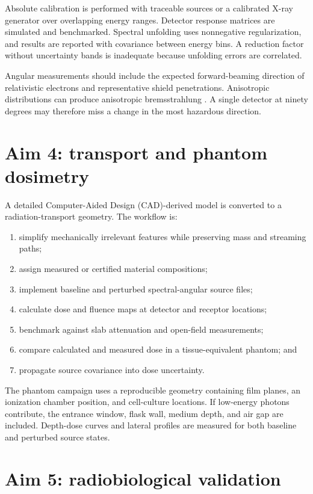 Absolute calibration is performed with traceable sources or a calibrated X-ray generator over overlapping energy ranges. Detector response matrices are simulated and benchmarked. Spectral unfolding uses nonnegative regularization, and results are reported with covariance between energy bins. A reduction factor without uncertainty bands is inadequate because unfolding errors are correlated.

Angular measurements should include the expected forward-beaming direction of relativistic electrons and representative shield penetrations. Anisotropic distributions can produce anisotropic bremsstrahlung \cite{massone2004}. A single detector at ninety degrees may therefore miss a change in the most hazardous direction.

\section{Aim 4: transport and phantom dosimetry}

A detailed Computer-Aided Design (CAD)-derived model is converted to a radiation-transport geometry. The workflow is:
\begin{enumerate}
\item simplify mechanically irrelevant features while preserving mass and streaming paths;
\item assign measured or certified material compositions;
\item implement baseline and perturbed spectral-angular source files;
\item calculate dose and fluence maps at detector and receptor locations;
\item benchmark against slab attenuation and open-field measurements;
\item compare calculated and measured dose in a tissue-equivalent phantom; and
\item propagate source covariance into dose uncertainty.
\end{enumerate}

The phantom campaign uses a reproducible geometry containing film planes, an ionization chamber position, and cell-culture locations. If low-energy photons contribute, the entrance window, flask wall, medium depth, and air gap are included. Depth-dose curves and lateral profiles are measured for both baseline and perturbed source states.

\section{Aim 5: radiobiological validation}

